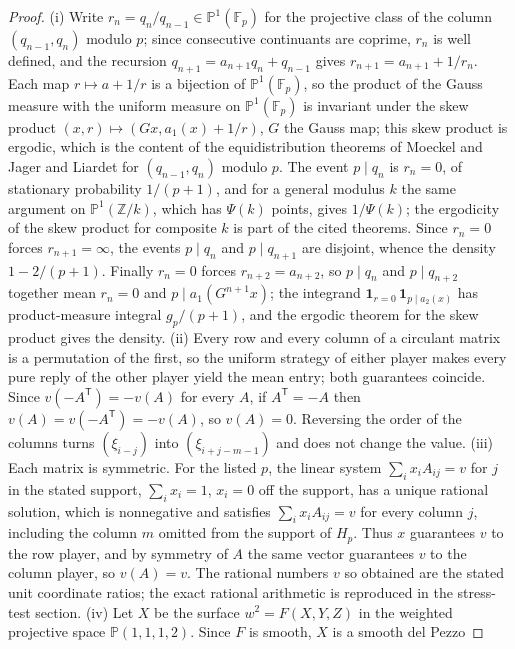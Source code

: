 \documentclass[11pt]{article}
\theoremstyle{definition}
\newcommand{\Fq}{\mathbb F}
\newcommand{\Z}{\mathbb Z}
\providecommand{\Z}{\mathbb Z}
\begin{document}
\begin{proof}
{\rm(i)} Write $r_n=q_n/q_{n-1}\in\mathbb P^1(\Fq_p)$ for the projective
class of the column $(q_{n-1},q_n)$ modulo $p$; since consecutive continuants
are coprime, $r_n$ is well defined, and the recursion
$q_{n+1}=a_{n+1}q_n+q_{n-1}$ gives $r_{n+1}=a_{n+1}+1/r_n$.  Each map
$r\mapsto a+1/r$ is a bijection of $\mathbb P^1(\Fq_p)$, so the product of the
Gauss measure with the uniform measure on $\mathbb P^1(\Fq_p)$ is invariant
under the skew product $(x,r)\mapsto(Gx,a_1(x)+1/r)$, $G$ the Gauss map;
this skew product is ergodic, which is the content of the equidistribution
theorems of Moeckel and Jager and
Liardet for $(q_{n-1},q_n)$ modulo $p$.  The event
$p\mid q_n$ is $r_n=0$, of stationary probability $1/(p+1)$, and for a
general modulus $k$ the same argument on $\mathbb P^1(\Z/k)$, which has
$\Psi(k)$ points, gives $1/\Psi(k)$; the ergodicity of the skew product
for composite $k$ is part of the cited theorems.  Since $r_n=0$ forces
$r_{n+1}=\infty$, the events $p\mid q_n$ and $p\mid q_{n+1}$ are disjoint,
whence the density $1-2/(p+1)$.  Finally $r_n=0$ forces $r_{n+2}=a_{n+2}$,
so $p\mid q_n$ and $p\mid q_{n+2}$ together mean $r_n=0$ and
$p\mid a_1(G^{n+1}x)$; the integrand $\mathbf 1_{r=0}\,\mathbf 1_{p\mid a_2(x)}$
has product-measure integral $g_p/(p+1)$, and the ergodic theorem for the
skew product gives the density.
{\rm(ii)} Every row and every column of a circulant matrix is a permutation of the
first, so the uniform strategy of either player makes every pure reply of
the other player yield the mean entry; both guarantees coincide.  Since $v(-A^{\mathsf T})=-v(A)$ for every
$A$, if $A^{\mathsf T}=-A$ then $v(A)=v(-A^{\mathsf T})=-v(A)$, so $v(A)=0$.  Reversing the order of the columns
turns $(\xi_{i-j})$ into $(\xi_{i+j-m-1})$ and does not change the value.
{\rm(iii)} Each matrix is symmetric.  For the listed $p$, the linear system
$\sum_i x_iA_{ij}=v$ for $j$ in the stated support, $\sum_ix_i=1$, $x_i=0$
off the support, has a unique rational solution, which is nonnegative and
satisfies $\sum_ix_iA_{ij}=v$ for every column $j$, including the column
$m$ omitted from the support of $H_p$.  Thus $x$ guarantees $v$ to the row
player, and by symmetry of $A$ the same vector guarantees $v$ to the column
player, so $v(A)=v$.  The rational numbers $v$ so obtained are the stated unit
coordinate ratios; the exact rational arithmetic is reproduced in the
stress-test section.
{\rm(iv)} Let $X$ be the surface $w^2=F(X,Y,Z)$ in the weighted projective
space $\mathbb P(1,1,1,2)$.  Since $F$ is smooth, $X$ is a smooth del Pezzo

\end{proof}
\end{document}
